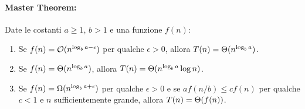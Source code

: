 \paragraph{Master Theorem:}
Date le costanti $a \ge 1$, $b > 1$ e una funzione $f(n)$:
\begin{enumerate}
    \item Se $f(n) = \mathcal{O}(n^{\log_b a - \epsilon})$ per qualche $\epsilon > 0$, allora $T(n) = \Theta(n^{\log_b a})$.
    \item Se $f(n) = \Theta(n^{\log_b a})$, allora $T(n) = \Theta(n^{\log_b a} \log n)$.
    \item Se $f(n) = \Omega(n^{\log_b a + \epsilon})$ per qualche $\epsilon > 0$ e se $a f(n/b) \le c f(n)$ per qualche $c < 1$ e $n$ sufficientemente grande, allora $T(n) = \Theta(f(n))$.
\end{enumerate}